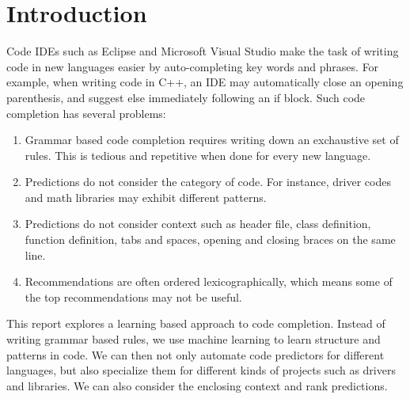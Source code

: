 \section{Introduction}
\label{sec:intro}

\noindent
Code IDEs such as Eclipse and Microsoft Visual Studio make the task of writing
code in new languages easier by auto-completing key words and phrases.
For example, when writing code in C++, an IDE may automatically close an
opening parenthesis, and suggest else immediately following an if block.
Such code completion has several problems:
\begin{enumerate}
  \item Grammar based code completion requires writing down an exchaustive set
    of rules. This is tedious and repetitive when done for every new language.
  \item Predictions do not consider the category of code. For instance, driver
    codes and math libraries may exhibit different patterns.
  \item Predictions do not consider context such as header file, class
    definition, function definition, tabs and spaces, opening and closing
    braces on the same line.
  \item Recommendations are often ordered lexicographically, which means some
    of the top recommendations may not be useful.
\end{enumerate}

\noindent
This report explores a learning based approach to code completion. Instead of
writing grammar based rules, we use machine learning to learn structure and
patterns in code. We can then not only automate code predictors for different
languages, but also specialize them for different kinds of projects such as
drivers and libraries. We can also consider the enclosing context and rank
predictions.
